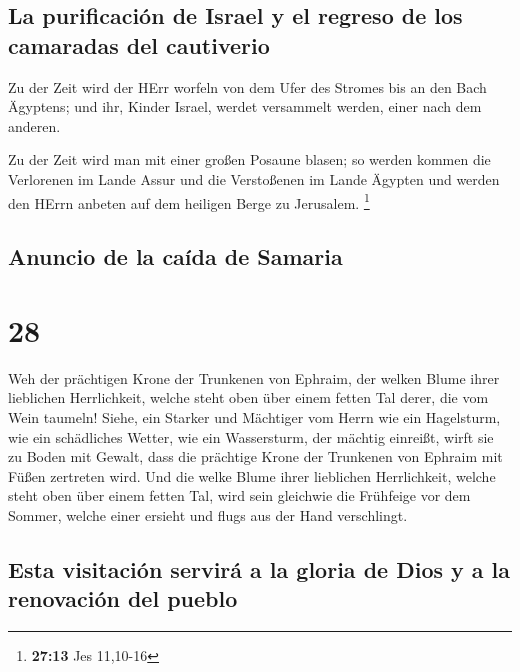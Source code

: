 \hypertarget{la-purificaciuxf3n-de-israel-y-el-regreso-de-los-camaradas-del-cautiverio}{%
\subsection{La purificación de Israel y el regreso de los camaradas del
cautiverio}\label{la-purificaciuxf3n-de-israel-y-el-regreso-de-los-camaradas-del-cautiverio}}

 Zu der Zeit wird der HErr worfeln von dem Ufer des
Stromes bis an den Bach Ägyptens; und ihr, Kinder Israel, werdet
versammelt werden, einer nach dem anderen.

 Zu der Zeit wird man mit einer großen Posaune blasen; so
werden kommen die Verlorenen im Lande Assur und die Verstoßenen im Lande
Ägypten und werden den HErrn anbeten auf dem heiligen Berge zu
Jerusalem. \footnote{\textbf{27:13} Jes 11,10-16}

\hypertarget{anuncio-de-la-cauxedda-de-samaria}{%
\subsection{Anuncio de la caída de
Samaria}\label{anuncio-de-la-cauxedda-de-samaria}}

\hypertarget{section-27}{%
\section{28}\label{section-27}}

 Weh der prächtigen Krone der Trunkenen von Ephraim, der
welken Blume ihrer lieblichen Herrlichkeit, welche steht oben über einem
fetten Tal derer, die vom Wein taumeln!  Siehe, ein
Starker und Mächtiger vom Herrn wie ein Hagelsturm, wie ein schädliches
Wetter, wie ein Wassersturm, der mächtig einreißt, wirft sie zu Boden
mit Gewalt,  dass die prächtige Krone der Trunkenen von
Ephraim mit Füßen zertreten wird.  Und die welke Blume
ihrer lieblichen Herrlichkeit, welche steht oben über einem fetten Tal,
wird sein gleichwie die Frühfeige vor dem Sommer, welche einer ersieht
und flugs aus der Hand verschlingt.

\hypertarget{esta-visitaciuxf3n-serviruxe1-a-la-gloria-de-dios-y-a-la-renovaciuxf3n-del-pueblo}{%
\subsection{Esta visitación servirá a la gloria de Dios y a la
renovación del
pueblo}\label{esta-visitaciuxf3n-serviruxe1-a-la-gloria-de-dios-y-a-la-renovaciuxf3n-del-pueblo}}

